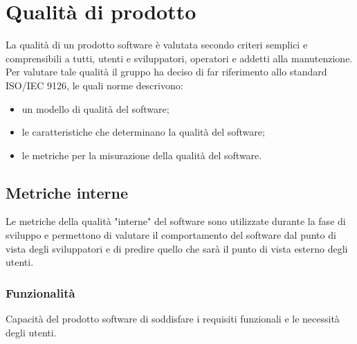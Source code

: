 
\section{Qualità di prodotto}
La qualità di un prodotto software è valutata secondo criteri semplici e comprensibili a tutti, utenti e sviluppatori, operatori e addetti alla manutenzione.
Per valutare tale qualità il gruppo \Gruppo{} ha deciso di far riferimento allo standard ISO/IEC 9126, le quali norme descrivono:
\begin{itemize}
\item un modello di qualità del software; 
\item le caratteristiche che determinano la qualità del software;
\item le metriche per la misurazione della qualità del software.
\end{itemize}

\subsection{Metriche interne}
 Le metriche della qualità "interne" del software sono utilizzate durante la fase di sviluppo e permettono di valutare il comportamento del software dal punto di vista degli sviluppatori e di predire quello che sarà il punto di vista esterno degli utenti.
  \subsubsection{Funzionalità}
      Capacità del prodotto software di soddisfare i requisiti funzionali e le necessità degli utenti.

